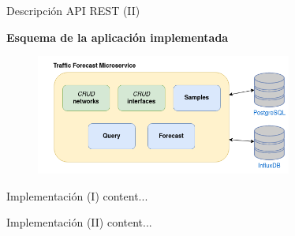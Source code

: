 \documentclass[aspectratio=169,xcolor=dvipsnames]{beamer}
\begin{document}
	
	\begin{frame}{Descripción API REST (II)}
		
		\textbf{Esquema de la aplicación implementada}
		
		\begin{figure}[h!]
			\begin{center}
				\includegraphics[width=0.75\textwidth]{diag/traffic_forecast_schema.png}
			\end{center}
		\end{figure}
	\end{frame}
	
	
	\begin{frame}{Implementación (I)}
		content...
	\end{frame}

	\begin{frame}{Implementación (II)}
		content...
	\end{frame}
	
	
\end{document}

